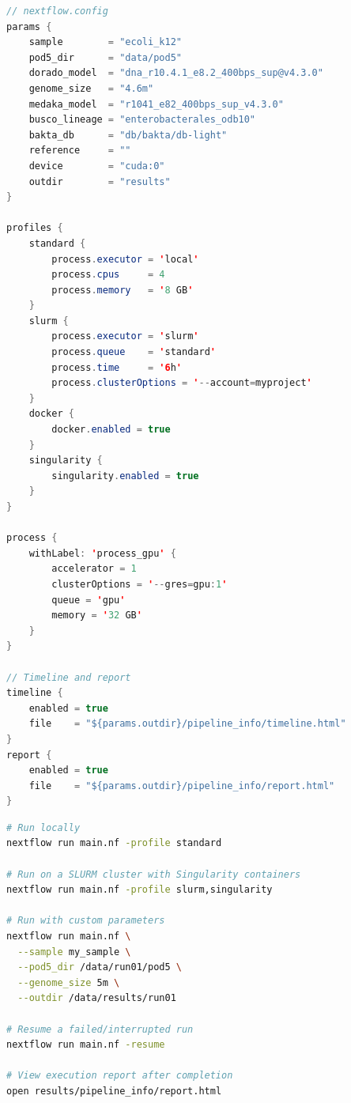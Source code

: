 \begin{lstlisting}[language=Java,caption={Nextflow configuration file (nextflow.config).},label=lst:diy-nf-e2e-config]
// nextflow.config
params {
    sample        = "ecoli_k12"
    pod5_dir      = "data/pod5"
    dorado_model  = "dna_r10.4.1_e8.2_400bps_sup@v4.3.0"
    genome_size   = "4.6m"
    medaka_model  = "r1041_e82_400bps_sup_v4.3.0"
    busco_lineage = "enterobacterales_odb10"
    bakta_db      = "db/bakta/db-light"
    reference     = ""
    device        = "cuda:0"
    outdir        = "results"
}

profiles {
    standard {
        process.executor = 'local'
        process.cpus     = 4
        process.memory   = '8 GB'
    }
    slurm {
        process.executor = 'slurm'
        process.queue    = 'standard'
        process.time     = '6h'
        process.clusterOptions = '--account=myproject'
    }
    docker {
        docker.enabled = true
    }
    singularity {
        singularity.enabled = true
    }
}

process {
    withLabel: 'process_gpu' {
        accelerator = 1
        clusterOptions = '--gres=gpu:1'
        queue = 'gpu'
        memory = '32 GB'
    }
}

// Timeline and report
timeline {
    enabled = true
    file    = "${params.outdir}/pipeline_info/timeline.html"
}
report {
    enabled = true
    file    = "${params.outdir}/pipeline_info/report.html"
}
\end{lstlisting}

\begin{lstlisting}[language=bash,caption={Running the complete Nextflow pipeline.},label=lst:diy-nf-e2e-run]
# Run locally
nextflow run main.nf -profile standard

# Run on a SLURM cluster with Singularity containers
nextflow run main.nf -profile slurm,singularity

# Run with custom parameters
nextflow run main.nf \
  --sample my_sample \
  --pod5_dir /data/run01/pod5 \
  --genome_size 5m \
  --outdir /data/results/run01

# Resume a failed/interrupted run
nextflow run main.nf -resume

# View execution report after completion
open results/pipeline_info/report.html
\end{lstlisting}

